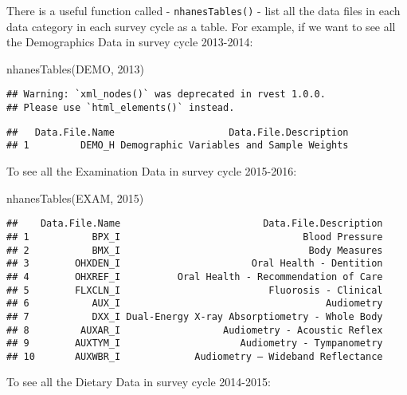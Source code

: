 \documentclass[
]{book}
\newenvironment{Shaded}{\begin{snugshade}}{\end{snugshade}}
\newcommand{\DecValTok}[1]{\textcolor[rgb]{0.00,0.00,0.81}{#1}}
\newcommand{\FunctionTok}[1]{\textcolor[rgb]{0.00,0.00,0.00}{#1}}
\newcommand{\NormalTok}[1]{#1}
\newcommand{\StringTok}[1]{\textcolor[rgb]{0.31,0.60,0.02}{#1}}
\begin{document}
There is a useful function called - \texttt{nhanesTables()} - list all the data files in each data category in each survey cycle as a table. For example, if we want to see all the Demographics Data in survey cycle 2013-2014:

\begin{Shaded}
\begin{Highlighting}[]
\FunctionTok{nhanesTables}\NormalTok{(}\StringTok{\textquotesingle{}DEMO\textquotesingle{}}\NormalTok{, }\DecValTok{2013}\NormalTok{)}
\end{Highlighting}
\end{Shaded}

\begin{verbatim}
## Warning: `xml_nodes()` was deprecated in rvest 1.0.0.
## Please use `html_elements()` instead.
\end{verbatim}

\begin{verbatim}
##   Data.File.Name                    Data.File.Description
## 1         DEMO_H Demographic Variables and Sample Weights
\end{verbatim}

To see all the Examination Data in survey cycle 2015-2016:

\begin{Shaded}
\begin{Highlighting}[]
\FunctionTok{nhanesTables}\NormalTok{(}\StringTok{\textquotesingle{}EXAM\textquotesingle{}}\NormalTok{, }\DecValTok{2015}\NormalTok{)}
\end{Highlighting}
\end{Shaded}

\begin{verbatim}
##    Data.File.Name                         Data.File.Description
## 1           BPX_I                                Blood Pressure
## 2           BMX_I                                 Body Measures
## 3        OHXDEN_I                       Oral Health - Dentition
## 4        OHXREF_I          Oral Health - Recommendation of Care
## 5        FLXCLN_I                          Fluorosis - Clinical
## 6           AUX_I                                    Audiometry
## 7           DXX_I Dual-Energy X-ray Absorptiometry - Whole Body
## 8         AUXAR_I                  Audiometry - Acoustic Reflex
## 9        AUXTYM_I                     Audiometry - Tympanometry
## 10       AUXWBR_I             Audiometry – Wideband Reflectance
\end{verbatim}

To see all the Dietary Data in survey cycle 2014-2015:
\end{document}
